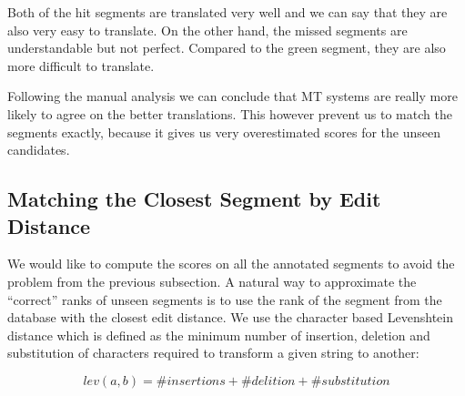 \noindent Both of the hit segments are translated very well and we can say that
they are also very easy to translate. On the other hand, the missed segments
are understandable but not perfect. Compared to the green segment, they are
also more difficult to translate.

Following the manual analysis we can conclude that MT systems are really more
likely to agree on the better translations. This however prevent us to match
the segments exactly, because it gives us very overestimated scores for the
unseen candidates.

\subsection{Matching the Closest Segment by Edit Distance}

We would like to compute the scores on all the annotated segments to avoid the
problem from the previous subsection. A natural way to approximate the
``correct'' ranks of unseen segments is to use the rank of the segment from the
database with the closest edit distance. We use the character based Levenshtein
distance which is defined as the minimum number of insertion, deletion and
substitution of characters required to transform a given string to another:

\begin{equation*}
  lev(a,b) = \#insertions + \#delition + \#substitution
\end{equation*}


